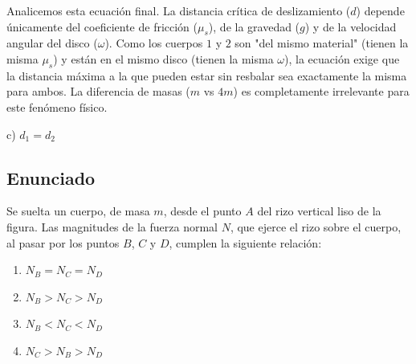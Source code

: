 \documentclass[12pt, a4paper]{article}
\begin{document}
Analicemos esta ecuación final. La distancia crítica de deslizamiento ($d$) depende únicamente del coeficiente de fricción ($\mu_s$), de la gravedad ($g$) y de la velocidad angular del disco ($\omega$).
Como los cuerpos $1$ y $2$ son "del mismo material" (tienen la misma $\mu_s$) y están en el mismo disco (tienen la misma $\omega$), la ecuación exige que la distancia máxima a la que pueden estar sin resbalar sea exactamente la misma para ambos. La diferencia de masas ($m$ vs $4m$) es completamente irrelevante para este fenómeno físico.

\begin{tcolorbox}[colback=green!5!white, colframe=green!50!black, title=Respuesta Final]
\centering \Large c) $d_1 = d_2$
\end{tcolorbox}

\newpage

\subsection*{Enunciado}
Se suelta un cuerpo, de masa $m$, desde el punto $A$ del rizo vertical liso de la figura. Las magnitudes de la fuerza normal $N$, que ejerce el rizo sobre el cuerpo, al pasar por los puntos $B$, $C$ y $D$, cumplen la siguiente relación:

\begin{center}
\end{center}

\begin{enumerate}[label=\alph*)]
    \item $N_B = N_C = N_D$
    \item $N_B > N_C > N_D$
    \item $N_B < N_C < N_D$
    \item $N_C > N_B > N_D$
\end{enumerate}
\end{document}
